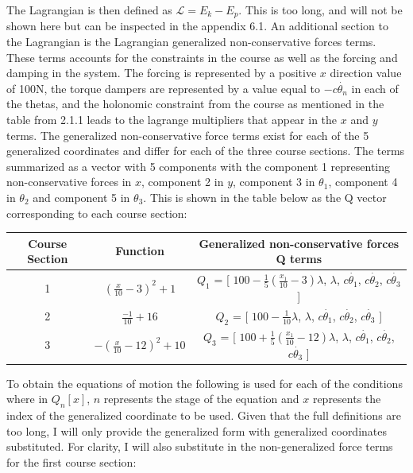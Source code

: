 \documentclass{article}
\begin{document}
The Lagrangian is then defined as $\mathcal{L} = E_k - E_p$. This is too long, and will not be shown here but can be inspected in the appendix 6.1.
An additional section to the Lagrangian is the Lagrangian generalized non-conservative forces terms. These terms accounts for the constraints in the course as well as the forcing and damping in the system. The forcing is represented by a positive $x$ direction value of 100N, the torque dampers are represented by a value equal to $-c\dot{\theta_n}$ in each of the thetas, and the holonomic constraint from the course as mentioned in the table from 2.1.1 leads to the lagrange multipliers that appear in the $x$ and $y$ terms. The generalized non-conservative force terms exist for each of the 5 generalized coordinates and differ for each of the three course sections. The terms summarized as a vector with 5 components with the component 1 representing non-conservative forces in $x$, component 2 in $y$, component 3 in $\theta_1$, component 4 in $\theta_2$ and component 5 in $\theta_3$. This is shown in the table below as the Q vector corresponding to each course section:
\begin{center}
	\begin{tabular}{c|c|c}
		Course Section& Function & Generalized non-conservative forces Q terms\\
		\hline
		1&$(\frac{x}{10}-3)^2+1$ & $Q_1$ = [ $100 - \frac{1}{5} \left( \frac{x_1}{10} - 3 \right) \lambda$, $\lambda$, $c\dot{\theta_1}$,  $c\dot{\theta_2}$,  $c\dot{\theta_3}$ ]\\
		2&$\frac{-1}{10}+16$& $Q_2$ = [ $100-\frac{1}{10} \lambda$, $\lambda$, $c\dot{\theta_1}$,  $c\dot{\theta_2}$,  $c\dot{\theta_3}$ ]\\
		3&$-(\frac{x}{10}-12)^2+10$&$Q_3$ = [ $100 + \frac{1}{5} \left( \frac{x_1}{10} - 12 \right) \lambda$, $\lambda$, $c\dot{\theta_1}$,  $c\dot{\theta_2}$,  $c\dot{\theta_3}$ ]\\
		
	\end{tabular}
\end{center}
To obtain the equations of motion the following is used for each of the conditions where in $Q_n[x]$, $n$ represents the stage of the equation and $x$ represents the index of the generalized coordinate to be used. Given that the full definitions are too long, I will only provide the generalized form with generalized coordinates substituted. For clarity, I will also substitute in the non-generalized force terms for the first course section:
\end{document}
